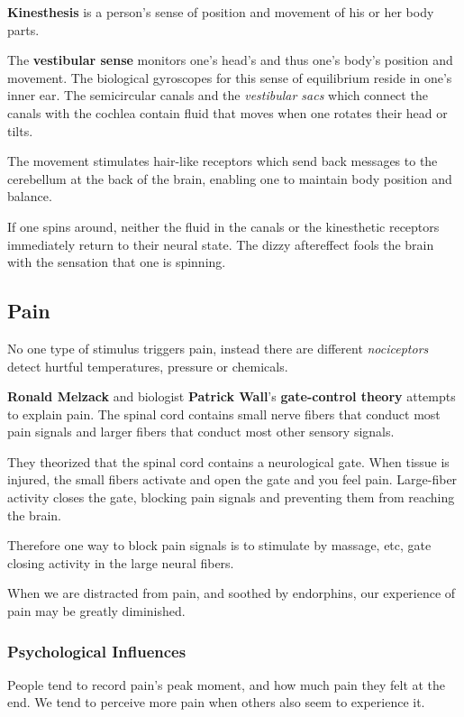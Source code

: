 \documentclass[12pt]{article}
\begin{document}
\textbf{Kinesthesis} is a person's sense of position and movement of his or her body parts.

The \textbf{vestibular sense} monitors one's head's and thus one's body's position and movement. The biological gyroscopes for this sense of equilibrium reside in one's inner ear. The semicircular canals and the \textit{vestibular sacs} which connect the canals with the cochlea contain fluid that moves when one rotates their head or tilts.

The movement stimulates hair-like receptors which send back messages to the cerebellum at the back of the brain, enabling one to maintain body position and balance.

If one spins around, neither the fluid in the canals or the kinesthetic receptors immediately return to their neural state. The dizzy aftereffect fools the brain with the sensation that one is spinning.

\subsection*{Pain}
No one type of stimulus triggers pain, instead there are different \textit{nociceptors} detect hurtful temperatures, pressure or chemicals. 

{\bf Ronald Melzack} and biologist {\bf Patrick Wall}'s \textbf{gate-control theory} attempts to explain pain. The spinal cord contains small nerve fibers that conduct most pain signals and larger fibers that conduct most other sensory signals.

They theorized that the spinal cord contains a neurological gate. When tissue is injured, the small fibers activate and open the gate and you feel pain. Large-fiber activity closes the gate, blocking pain signals and preventing them from reaching the brain.

Therefore one way to block pain signals is to stimulate by massage, etc, gate closing activity in the large neural fibers. 

When we are distracted from pain, and soothed by endorphins, our experience of pain may be greatly diminished.

\subsubsection*{Psychological Influences}
People tend to record pain's peak moment, and how much pain they felt at the end. We tend to perceive more pain when others also seem to experience it.
\end{document}
